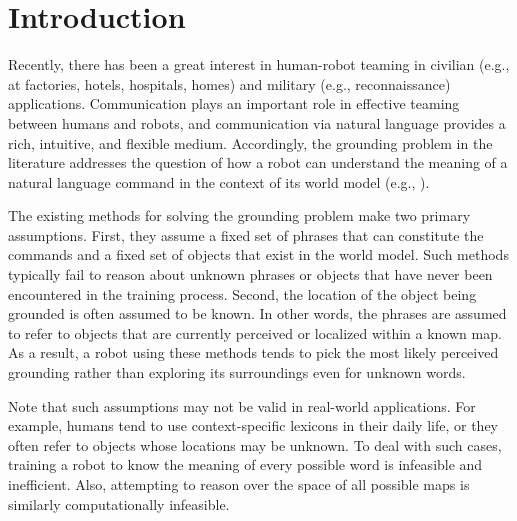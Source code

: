 \section{Introduction}
Recently, there has been a great interest in human-robot teaming in civilian (e.g., at factories, hotels, hospitals, homes) and military (e.g., reconnaissance) applications. Communication plays an important role in effective teaming between humans and robots, and communication via natural language provides a rich, intuitive, and flexible medium. Accordingly, the grounding problem in the literature addresses the question of how a robot can understand the meaning of a natural language command in the context of its world model (e.g., \cite{g3,dcg,adcg2016}). 

The existing methods for solving the grounding problem make two primary assumptions. First, they assume a fixed set of phrases that can constitute the commands and a fixed set of objects that exist in the world model. Such methods typically fail to reason about unknown phrases or objects that have never been encountered in the training process.
Second, the location of the object being grounded is often assumed to be known. In other words, the phrases are assumed to refer to objects that are currently perceived or localized within a known map.
As a result, a robot using these methods tends to pick the most likely perceived grounding rather than exploring its surroundings even for unknown words.

Note that such assumptions may not be valid in real-world applications. For example, humans tend to use context-specific lexicons in their daily life, or they often refer to objects whose locations may be unknown. To deal with such cases, training a robot to know the meaning of every possible word is infeasible and inefficient. Also, attempting to reason over the space of all possible maps is similarly computationally infeasible.

